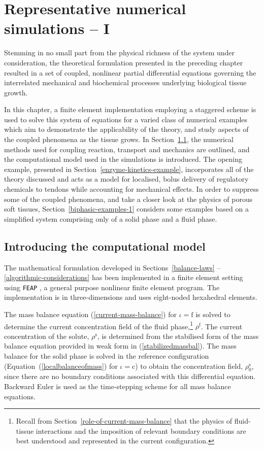\chapter{Representative numerical simulations -- I}
\label{numerical-simulations-1}

Stemming in no small part from the physical richness of the system
under consideration, the theoretical formulation presented in the
preceding chapter resulted in a set of coupled, nonlinear partial
differential equations governing the interrelated mechanical and
biochemical processes underlying biological tissue growth.

In this chapter, a finite element implementation employing a staggered
scheme is used to solve this system of equations for a varied class of
numerical examples which aim to demonstrate the applicability of the
theory, and study aspects of the coupled phenomena as the tissue
grows. In Section~\ref{computational-model}, the numerical methods
used for coupling reaction, transport and mechanics are outlined, and
the computational model used in the simulations is introduced. The
opening example, presented in Section~\ref{enzyme-kinetics-example},
incorporates all of the theory discussed and acts as a model for
localised, bolus delivery of regulatory chemicals to tendons while
accounting for mechanical effects. In order to suppress some of the
coupled phenomena, and take a closer look at the physics of porous
soft tissues, Section~\ref{biphasic-examples-1} considers some
examples based on a simplified system comprising only of a solid phase
and a fluid phase.

\section{Introducing the computational model}
\label{computational-model}

The mathematical formulation developed in Sections~\ref{balance-laws}%
--\ref{algorithmic-considerations} has been implemented in a finite
element setting using {\tt FEAP} \citep{FEAPmanual}, a general purpose
nonlinear finite element program. The implementation is in
three-dimensions and uses eight-noded hexahedral elements.

The mass balance equation (\ref{current-mass-balance}) for
\mbox{$\iota = \mathrm{f}$} is solved to determine the current
concentration field of the fluid phase,\footnote{Recall from
  Section~\ref{role-of-current-mass-balance} that the physics of
  fluid-tissue interactions and the imposition of relevant boundary
  conditions are best understood and represented in the current
  configuration.} $\rho^{\mathrm{f}}$. The current concentration of
the solute, $\rho^{\mathrm{s}}$, is determined from the stabilised
form of the mass balance equation provided in weak form in
(\ref{stabilizedmassbal}). The mass balance for the solid phase is
solved in the reference configuration
(Equation~(\ref{localbalanceofmass}) for \mbox{$\iota = \mathrm{c}$})
to obtain the concentration field, $\rho_{0}^{\mathrm{s}}$, since
there are no boundary conditions associated with this differential
equation. Backward Euler is used as the time-stepping scheme for all
mass balance equations.

